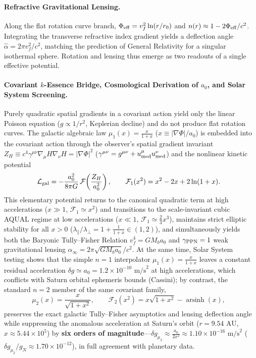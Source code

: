 \documentclass[11pt,a4paper]{article}
\begin{document}
\paragraph{Refractive Gravitational Lensing.} Along the flat rotation curve branch, $\Phi_{\rm eff} = v_f^2 \ln(r/r_0)$ and $n(r) \approx 1 - 2\Phi_{\rm eff}/c^2$. Integrating the transverse refractive index gradient yields a deflection angle $\hat{\alpha} = 2\pi v_f^2 / c^2$, matching the prediction of General Relativity for a singular isothermal sphere. Rotation and lensing thus emerge as two readouts of a single effective potential.

\paragraph{Covariant $k$-Essence Bridge, Cosmological Derivation of $a_0$, and Solar System Screening.} Purely quadratic spatial gradients in a covariant action yield only the linear Poisson equation ($g \propto 1/r^2$, Keplerian decline) and do not produce flat rotation curves. The galactic algebraic law $\mu_1(x) = \frac{x}{1+x}$ ($x \equiv |\nabla\Phi|/a_0$) is embedded into the covariant action through the observer's spatial gradient invariant $Z_H \equiv c^4\gamma^{\mu\nu}\nabla_\mu H\nabla_\nu H = |\nabla\Phi|^2$ ($\gamma^{\mu\nu} = g^{\mu\nu} + u_{\rm med}^\mu u_{\rm med}^\nu$) and the nonlinear kinetic potential
\begin{equation}
\mathcal{L}_{\rm gal} = -\frac{a_0^2}{8\pi G}\,\mathcal{F}\!\left(\frac{Z_H}{a_0^2}\right), \qquad \mathcal{F}_1(x^2) = x^2 - 2x + 2\ln(1+x).
\end{equation}
This elementary potential returns to the canonical quadratic term at high accelerations ($x \gg 1$, $\mathcal{F}_1 \simeq x^2$) and transitions to the scale-invariant cubic AQUAL regime at low accelerations ($x \ll 1$, $\mathcal{F}_1 \simeq \frac{2}{3}x^3$), maintains strict elliptic stability for all $x>0$ ($\lambda_\parallel/\lambda_\perp = 1 + \frac{1}{1+x} \in (1,2)$), and simultaneously yields both the Baryonic Tully--Fisher Relation $v_f^4 = G M_b a_0$ and $\gamma_{\rm PPN}=1$ weak gravitational lensing $\alpha_\infty = 2\pi\sqrt{G M_b a_0}/c^2$. At the same time, Solar System testing shows that the simple $n=1$ interpolator $\mu_1(x)=\frac{x}{1+x}$ leaves a constant residual acceleration $\delta g \simeq a_0 = 1.2\times 10^{-10}\text{ m/s}^2$ at high accelerations, which conflicts with Saturn orbital ephemeris bounds (Cassini); by contrast, the standard $n=2$ member of the same covariant family,
\begin{equation}
\mu_2(x) = \frac{x}{\sqrt{1+x^2}}, \qquad \mathcal{F}_2(x^2) = x\sqrt{1+x^2} - \operatorname{arsinh}(x),
\end{equation}
preserves the exact galactic Tully--Fisher asymptotics and lensing deflection angle while suppressing the anomalous acceleration at Saturn's orbit ($r = 9.54\text{ AU}$, $x \approx 5.44\times 10^5$) by \textbf{six orders of magnitude}---$\delta g_{\mu_2} \approx \frac{a_0}{2x^2} \approx 1.10\times 10^{-16}\text{ m/s}^2$ ($\delta g_{\mu_2}/g_N \approx 1.70\times 10^{-12}$), in full agreement with planetary data.
\end{document}
